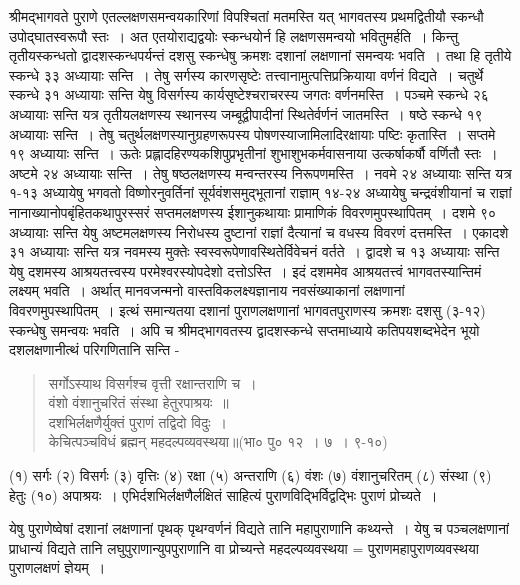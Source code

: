 {श्रीमद्भागवते पुराणे एतल्लक्षणसमन्वयकारिणां विपश्चितां मतमस्ति यत् भागवतस्य प्रथमद्वितीयौ स्कन्धौ उपोद्घातस्वरूपौ स्तः~। अत एतयोराद्यद्वयोः स्कन्धयोर्न हि लक्षणसमन्वयो भवितुमर्हति~। किन्तु तृतीयस्कन्धतो द्वादशस्कन्धपर्यन्तं दशसु स्कन्धेषु क्रमशः दशानां लक्षणानां समन्वयः भवति~। तथा हि तृतीये स्कन्धे ३३ अध्यायाः सन्ति~। तेषु सर्गस्य कारणसृष्टेः तत्त्वानामुत्पत्तिप्रक्रियाया वर्णनं विद्यते~। चतुर्थे स्कन्धे ३१ अध्यायाः सन्ति येषु विसर्गस्य कार्यसृष्टेश्चराचरस्य जगतः वर्णनमस्ति~। पञ्चमे स्कन्धे २६ अध्यायाः सन्ति यत्र तृतीयलक्षणस्य स्थानस्य जम्बूद्वीपादीनां स्थितेर्वर्णनं जातमस्ति~। षष्ठे स्कन्धे १९ अध्यायाः सन्ति~। तेषु चतुर्थलक्षणस्यानुग्रहणरूपस्य पोषणस्याजामिलादिरक्षायाः पष्टिः कृतास्ति~। सप्तमे १९ अध्यायाः सन्ति~। ऊतेः प्रह्लादहिरण्यकशिपुप्रभृतीनां शुभाशुभकर्मवासनाया उत्कर्षाकर्षौ वर्णितौ स्तः~। अष्टमे २४ अध्यायाः सन्ति~। तेषु षष्ठलक्षणस्य मन्वन्तरस्य निरूपणमस्ति~। नवमे २४ अध्यायाः सन्ति यत्र १-१३ अध्यायेषु भगवतो विष्णोरनुवर्तिनां सूर्यवंशसमुद्भूतानां राज्ञाम् १४-२४ अध्यायेषु चन्द्रवंशीयानां च राज्ञां नानाख्यानोपबृंहितकथापुरस्सरं सप्तमलक्षणस्य ईशानुकथायाः प्रामाणिकं विवरणमुपस्थापितम्~। दशमे ९० अध्यायाः सन्ति येषु अष्टमलक्षणस्य निरोधस्य दुष्टानां राज्ञां दैत्यानां च वधस्य विवरणं दत्तमस्ति~। एकादशे ३१ अध्यायाः सन्ति यत्र नवमस्य मुक्तेः स्वस्वरूपेणावस्थितेर्विवेचनं वर्तते~। द्वादशे च १३ अध्यायाः सन्ति येषु दशमस्य आश्रयतत्त्वस्य परमेश्वरस्योपदेशो दत्तोऽस्ति~। इदं दशममेव आश्रयतत्त्वं भागवतस्यान्तिमं लक्ष्यम् भवति~। अर्थात् मानवजन्मनो वास्तविकलक्ष्यज्ञानाय नवसंख्याकानां लक्षणानां विवरणमुपस्थापितम्~। इत्थं समान्यतया दशानां पुराणलक्षणानां भागवतपुराणस्य क्रमशः दशसु (३-१२) स्कन्धेषु समन्वयः भवति~। अपि च श्रीमद्भागवतस्य द्वादशस्कन्धे सप्तमाध्याये कतिपयशब्दभेदेन भूयो दशलक्षणानीत्थं परिगणितानि सन्ति -
\begin{verse}
सर्गोऽस्याथ विसर्गश्च वृत्ती रक्षान्तराणि च~। \\
वंशो वंशानुचरितं संस्था हेतुरपाश्रयः~॥\\
दशभिर्लक्षणैर्युक्तं पुराणं तद्विदो विदुः~। \\
केचित्पञ्चविधं ब्रह्मन् महदल्पव्यवस्थया॥(भा० पु० १२~। ७~। ९-१०)
\end{verse}
(१) सर्गः (२) विसर्गः (३) वृत्तिः (४) रक्षा (५) अन्तराणि (६) वंशः (७) वंशानुचरितम् (८) संस्था (९) हेतुः (१०) अपाश्रयः~। एभिर्दशभिर्लक्षणैर्लक्षितं साहित्यं पुराणविद्भिर्विद्वद्भिः पुराणं प्रोच्यते~। 

येषु पुराणेष्वेषां दशानां लक्षणानां पृथक् पृथग्वर्णनं विद्यते तानि महापुराणानि कथ्यन्ते~। येषु च पञ्चलक्षणानां प्राधान्यं विद्यते तानि लघुपुराणान्युपपुराणानि वा प्रोच्यन्ते महदल्पव्यवस्थया = पुराणमहापुराणव्यवस्थया पुराणलक्षणं ज्ञेयम्~। 

}
